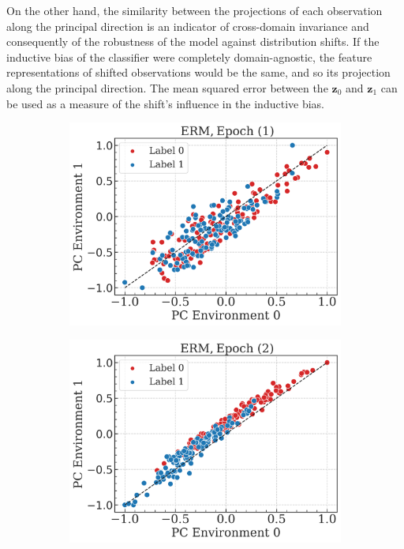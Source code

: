     On the other hand, the similarity between the projections of each observation along the principal direction 
    is an indicator of cross-domain invariance and consequently of the robustness of the model against 
    distribution shifts. If the inductive bias of the classifier were completely domain-agnostic, the 
    feature representations of shifted observations would be the same, and so its projection along the principal 
    direction. The mean squared error between the $\bm{z}_0$ and $\bm{z}_1$ can be used as a measure of
    the shift's influence in the inductive bias. \\


\begin{figure}[H]
    \centering
    \begin{subfigure}[b]{0.32\textwidth}
        \centering
        \includegraphics[width=\textwidth]{img/results_discussion/datashift/NL_1.png}
    \end{subfigure}
    \hfill
    \begin{subfigure}[b]{0.32\textwidth}
        \centering
        \includegraphics[width=\textwidth]{img/results_discussion/datashift/NL_2.png}

\end{subfigure}
\end{figure}
